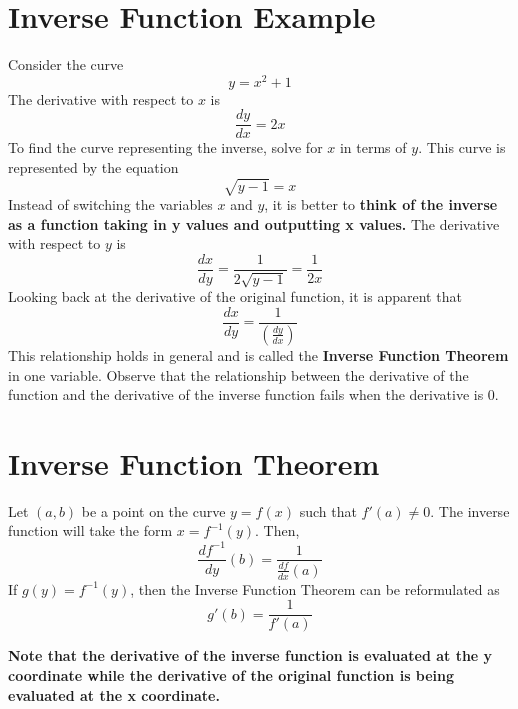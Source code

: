 \documentclass[12pt]{article}
\numberwithin{equation}{section}
\begin{document}
\section{Inverse Function Example}
Consider the curve \[y = x^2+1\] The derivative with respect to $x$ is \[\frac{dy}{dx} = 2x\] To find the curve representing the inverse, solve for $x$ in terms of $y$. This curve is represented by the equation \[\sqrt{y-1} =x\] Instead of switching the variables $x$ and $y$, it is better to \textbf{think of the inverse as a function taking in y values and outputting x values.} The derivative with respect to $y$ is \[\frac{dx}{dy} = \frac{1}{2\sqrt{y-1}} = \frac{1}{2x}\] Looking back at the derivative of the original function, it is apparent that \[\frac{dx}{dy} = \frac{1}{\left(\frac{dy}{dx}\right)}\] This relationship holds in general and is called the \textbf{Inverse Function Theorem} in one variable. Observe that the relationship between the derivative of the function and the derivative of the inverse function fails when the derivative is 0. 

\section{Inverse Function Theorem}
Let $(a,b)$ be a point on the curve $y = f(x)$ such that $f'(a) \neq 0$. The inverse function will take the form $x = f^{-1}(y)$. Then, \[\frac{df^{-1}}{dy}(b) = \frac{1}{\frac{df}{dx}(a)}\] If $g(y) = f^{-1}(y)$, then the Inverse Function Theorem can be reformulated as \[g'(b) = \frac{1}{f'(a)}\]

\textbf{Note that the derivative of the inverse function is evaluated at the y coordinate while the derivative of the original function is being evaluated at the x coordinate.}
\end{document}

